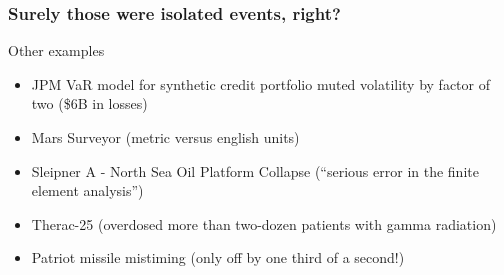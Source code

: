 \documentclass[mathserif]{beamer}
\begin{document}

 


 \begin{frame}
   \frametitle{Surely those were isolated events, right?}
  \begin{block}{Other examples}
    \begin{itemize}
    \item JPM VaR model for synthetic credit portfolio muted volatility by factor of two (\$6B in losses)
    \item Mars Surveyor (metric versus english units)
    \item Sleipner A - North Sea Oil Platform Collapse (``serious error in the finite element analysis'')
    \item Therac-25 (overdosed more than two-dozen patients with gamma radiation)
    \item Patriot missile mistiming (only off by one third of a second!)
    \end{itemize}
    \end{block}
 \end{frame}
\end{document}
